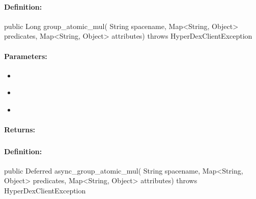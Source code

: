 \paragraph{Definition:}
\begin{javacode}
public Long group_atomic_mul(
        String spacename,
        Map<String, Object> predicates,
        Map<String, Object> attributes) throws HyperDexClientException
\end{javacode}

\paragraph{Parameters:}
\begin{itemize}[noitemsep]
\item {}\\

\item {}\\

\item {}\\

\end{itemize}

\paragraph{Returns:}


\pagebreak
\subsubsection{}
\label{api:java:async_group_atomic_mul}


\paragraph{Definition:}
\begin{javacode}
public Deferred async_group_atomic_mul(
        String spacename,
        Map<String, Object> predicates,
        Map<String, Object> attributes) throws HyperDexClientException
\end{javacode}

